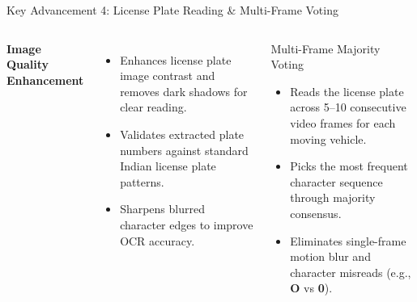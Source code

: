 \documentclass[10pt, compress, aspectratio=169]{beamer}
\begin{document}
\begin{frame}{Key Advancement 4: License Plate Reading \& Multi-Frame Voting}
    \begin{columns}[c]
        \textbf{\textcolor{BTPPrimary}{Image Quality Enhancement}}
        \vspace{2mm}
        \begin{itemize}\small
            \item Enhances license plate image contrast and removes dark shadows for clear reading.
            \item Validates extracted plate numbers against standard Indian license plate patterns.
            \item Sharpens blurred character edges to improve OCR accuracy.
        \end{itemize}

        \begin{block}{Multi-Frame Majority Voting}
            \begin{itemize}\small
                \item Reads the license plate across 5--10 consecutive video frames for each moving vehicle.
                \item Picks the most frequent character sequence through majority consensus.
                \item Eliminates single-frame motion blur and character misreads (e.g., \textbf{O} vs \textbf{0}).
            \end{itemize}
        \end{block}
    \end{columns}
\end{frame}
\end{document}
